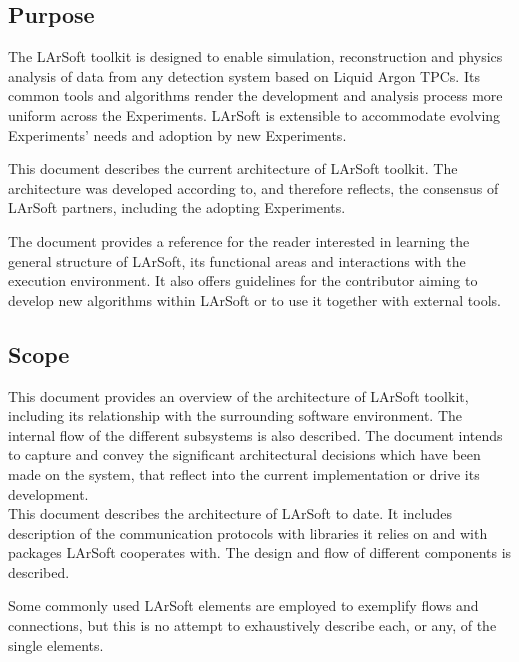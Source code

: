 
\subsection{Purpose}
\label{ssec:purpose}

The LArSoft toolkit is designed to enable simulation, reconstruction and
physics analysis of data from any detection system based on Liquid Argon
TPCs. Its common tools and algorithms render the development and
analysis process more uniform across the Experiments. LArSoft is
extensible to accommodate evolving Experiments' needs and adoption by
new Experiments.

This document describes the current architecture of LArSoft toolkit.
The architecture was developed according to, and therefore reflects,
the consensus of LArSoft partners, including the adopting Experiments.

The document provides a reference for the reader interested in learning
the general structure of LArSoft, its functional areas and interactions
with the execution environment.
It also offers guidelines for the contributor aiming to develop new algorithms
within LArSoft or to use it together with external tools.


\subsection{Scope}
\label{ssec:scope}

This document provides an overview of the architecture of LArSoft
toolkit, including its relationship with the surrounding software
environment. The internal flow of the different subsystems is also
described. The document intends to capture and convey the significant
architectural decisions which have been made on the system, that reflect
into the current implementation or drive its development.\\

This document describes the architecture of LArSoft to date. It includes
description of the communication protocols with libraries it relies on
and with packages LArSoft cooperates with. The design and flow of
different components is described.

Some commonly used LArSoft elements are employed to exemplify
flows and connections, but this is no attempt to exhaustively describe
each, or any, of the single elements.

